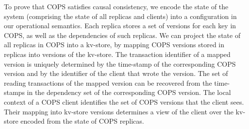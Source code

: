 

To prove that COPS satisfies causal consistency, we encode the state of the system 
(comprising the state of all replicas and clients) into a
configuration in  our operational semantics. 
Each replica stores a set of versions for each key in COPS, as well as the dependencies of 
such replicas. We can project the state of all replicas in COPS into a kv-store, 
by mapping  COPS versions stored in replicas into versions of the
kv-store. The transaction identifier of a mapped version is uniquely
determined by the time-stamp of the corresponding COPS version and 
by the identifier of the client that wrote the version. The set of reading transactions of the mapped version 
can be recovered from the time-stamps in the dependency set of the corresponding COPS version. 
The local context of a COPS client identifies the set of COPS versions
that the client sees.
Their mapping into kv-store versions determines a view of the client over the 
kv-store encoded from the state of COPS replicas.

